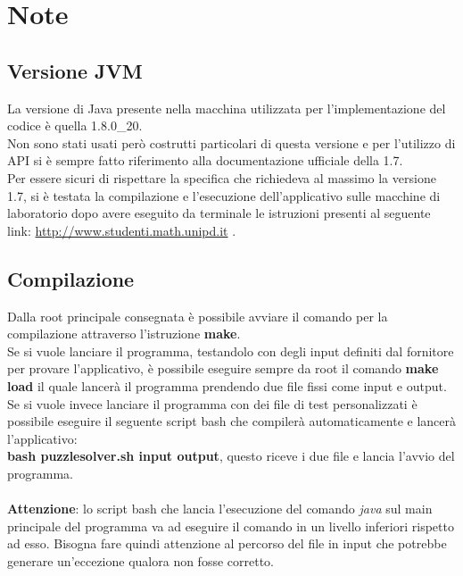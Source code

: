 % 
%
% 
%

\section{Note}
	\subsection{Versione JVM}
La versione di Java presente nella macchina utilizzata per l'implementazione del codice è quella 1.8.0\_20. \\
Non sono stati usati però costrutti particolari di questa versione e per l'utilizzo di API si è sempre fatto riferimento alla documentazione ufficiale della 1.7. \\
Per essere sicuri di rispettare la specifica che richiedeva al massimo la versione 1.7, si è testata la compilazione e l'esecuzione dell'applicativo sulle macchine di laboratorio dopo avere eseguito da terminale le istruzioni presenti al seguente link: \href{http://www.studenti.math.unipd.it/index.php?id=corsi#c620}{http://www.studenti.math.unipd.it} .

	\subsection{Compilazione}
Dalla root principale consegnata è possibile avviare il comando per la compilazione attraverso l'istruzione \textbf{make}. \\
Se si vuole lanciare il programma, testandolo con degli input definiti dal fornitore per provare l'applicativo, è possibile eseguire sempre da root il comando \textbf{make load} il quale lancerà il programma prendendo due file fissi come input e output. \\
Se si vuole invece lanciare il programma con dei file di test personalizzati è possibile eseguire il seguente script bash che compilerà automaticamente e lancerà l'applicativo: \\
\textbf{bash puzzlesolver.sh input output}, questo riceve i due file e lancia l'avvio del programma. \\ \\
\textbf{Attenzione}: lo script bash che lancia l'esecuzione del comando \emph{java} sul main principale del programma va ad eseguire il comando in un livello inferiori rispetto ad esso. Bisogna fare quindi attenzione al percorso del file in input che potrebbe generare un'eccezione qualora non fosse corretto.

